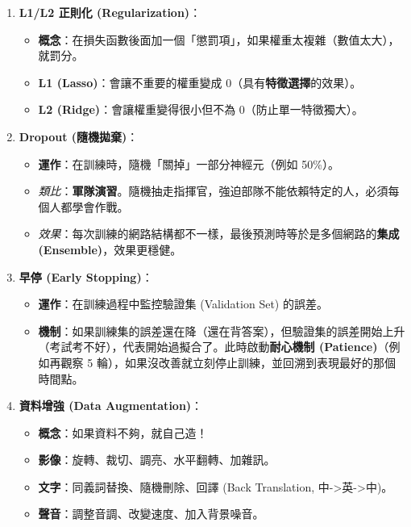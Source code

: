 \documentclass[
  letterpaper,
  DIV=11,
  numbers=noendperiod]{scrreprt}
\providecommand{\tightlist}{%
  \setlength{\itemsep}{0pt}\setlength{\parskip}{0pt}}
\begin{document}
\begin{enumerate}
\def\labelenumi{\arabic{enumi}.}
\tightlist
\item
  \textbf{L1/L2 正則化 (Regularization)}：

  \begin{itemize}
  \tightlist
  \item
    \textbf{概念}：在損失函數後面加一個「懲罰項」，如果權重太複雜（數值太大），就罰分。
  \item
    \textbf{L1 (Lasso)}：會讓不重要的權重變成
    0（具有\textbf{特徵選擇}的效果）。
  \item
    \textbf{L2 (Ridge)}：會讓權重變得很小但不為 0（防止單一特徵獨大）。
  \end{itemize}
\item
  \textbf{Dropout (隨機拋棄)}：

  \begin{itemize}
  \tightlist
  \item
    \textbf{運作}：在訓練時，隨機「關掉」一部分神經元（例如 50\%）。
  \item
    \emph{類比}：\textbf{軍隊演習}。隨機抽走指揮官，強迫部隊不能依賴特定的人，必須每個人都學會作戰。
  \item
    \emph{效果}：每次訓練的網路結構都不一樣，最後預測時等於是多個網路的\textbf{集成
    (Ensemble)}，效果更穩健。
  \end{itemize}
\item
  \textbf{早停 (Early Stopping)}：

  \begin{itemize}
  \tightlist
  \item
    \textbf{運作}：在訓練過程中監控驗證集 (Validation Set) 的誤差。
  \item
    \textbf{機制}：如果訓練集的誤差還在降（還在背答案），但驗證集的誤差開始上升（考試考不好），代表開始過擬合了。此時啟動\textbf{耐心機制
    (Patience)}（例如再觀察 5
    輪），如果沒改善就立刻停止訓練，並回溯到表現最好的那個時間點。
  \end{itemize}
\item
  \textbf{資料增強 (Data Augmentation)}：

  \begin{itemize}
  \tightlist
  \item
    \textbf{概念}：如果資料不夠，就自己造！
  \item
    \textbf{影像}：旋轉、裁切、調亮、水平翻轉、加雜訊。
  \item
    \textbf{文字}：同義詞替換、隨機刪除、回譯 (Back Translation,
    中-\textgreater 英-\textgreater 中)。
  \item
    \textbf{聲音}：調整音調、改變速度、加入背景噪音。
  \end{itemize}
\end{enumerate}
\end{document}
